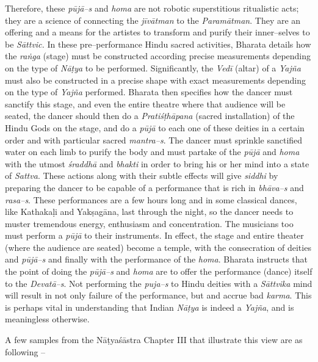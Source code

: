 Therefore, these \textit{pūjā–s} and \textit{homa} are not robotic superstitious ritualistic acts; they are a science of connecting the \textit{jīvātman} to the \textit{Paramātman}. They are an offering and a means for the artistes to transform and purify their inner–selves to be \textit{Sāttvic. }In these pre–performance Hindu sacred activities, Bharata details how the \textit{raṅga} (stage) must be constructed according precise measurements depending on the type of \textit{Nāṭya }to be performed. Significantly, the \textit{Vedī} (altar) of a \textit{Yajña} must also be constructed in a precise shape with exact measurements depending on the type of \textit{Yajña} performed. Bharata then specifies how the dancer must sanctify this stage, and even the entire theatre where that audience will be seated, the dancer should then do a \textit{Pratiśṭhāpana} (sacred installation) of the Hindu Gods on the stage, and do a \textit{pūjā }to each one of these deities in a certain order and with particular sacred \textit{mantra–s}. The dancer must sprinkle sanctified water on each limb to purify the body and must partake of the \textit{pūjā }and \textit{homa} with the utmost \textit{śraddhā} and \textit{bhakti }in order to bring his or her mind into a state of \textit{Sattva}. These actions along with their subtle effects will give \textit{siddhi} by preparing the dancer to be capable of a performance that is rich in \textit{bhāva–s} and \textit{rasa–s}. These performances are a few hours long and in some classical dances, like Kathakaḷi and Yakṣagāna, last through the night, so the dancer needs to muster tremendous energy, enthusiasm and concentration. The musicians too must perform a \textit{pūjā }to their instruments. In effect, the stage and entire theater (where the audience are seated) become a temple, with the consecration of deities and \textit{pūjā–s} and finally with the performance of the \textit{homa}. Bharata instructs that the point of doing the \textit{pūjā–s} and \textit{homa} are to offer the performance (dance) itself to the \textit{Devatā–s}. Not performing the \textit{puja–s} to Hindu deities with a \textit{Sāttvika} mind will result in not only failure of the performance, but and accrue bad \textit{karma}. This is perhaps vital in understanding that Indian \textit{Nāṭya} is indeed a \textit{Yajña}, and is meaningless otherwise.

A few samples from the Nāṭyaśāstra Chapter III that illustrate this view are as following –

